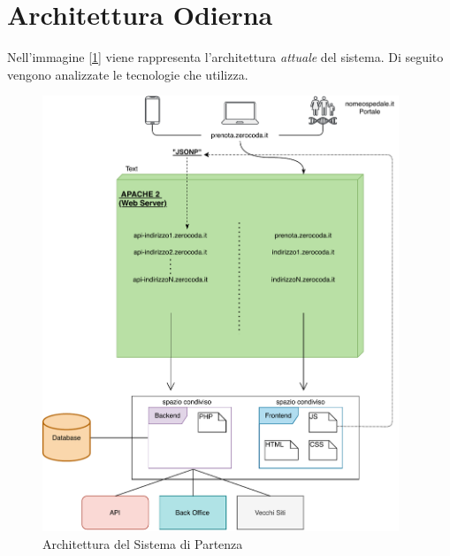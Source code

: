 \section{Architettura Odierna}
Nell'immagine [\ref{fig:oldarchitecture}] viene rappresenta l'architettura \emph{attuale} del sistema. Di seguito vengono analizzate le tecnologie che utilizza.
\begin{figure}[H]
    \centering
    \includegraphics[width=0.95\textwidth]{images/02_3_old_architecture.pdf}
    \caption{Architettura del Sistema di Partenza}
    \label{fig:oldarchitecture}
\end{figure}

